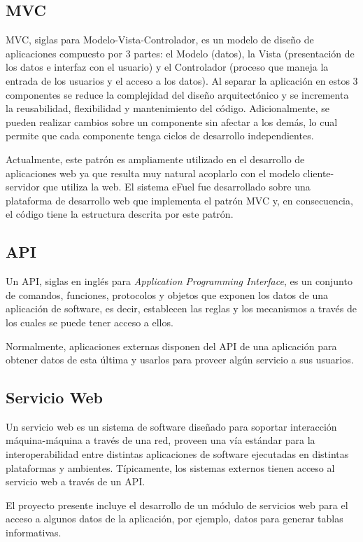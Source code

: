\subsection{MVC}
MVC, siglas para Modelo-Vista-Controlador, es un modelo de diseño de aplicaciones compuesto por 3 partes: el Modelo (datos), la Vista (presentación de los datos e interfaz con el usuario) y el Controlador (proceso que maneja la entrada de los usuarios y el acceso a los datos). \cite{mvcKrasner} Al separar la aplicación en estos 3 componentes se reduce la complejidad del diseño arquitectónico y se incrementa la reusabilidad, flexibilidad y mantenimiento del código. Adicionalmente, se pueden realizar cambios sobre un componente sin afectar a los demás, lo cual permite que cada componente tenga ciclos de desarrollo independientes.

Actualmente, este patrón es ampliamente utilizado en el desarrollo de aplicaciones web ya que resulta muy natural acoplarlo con el modelo cliente-servidor que utiliza la web. El sistema eFuel fue desarrollado sobre una plataforma de desarrollo web que implementa el patrón MVC y, en consecuencia, el código tiene la estructura descrita por este patrón.

\subsection{API}
Un API, siglas en inglés para \textit{Application Programming Interface}, es un conjunto de comandos, funciones, protocolos y objetos que exponen los datos de una aplicación de software, es decir, establecen las reglas y los mecanismos a través de los cuales se puede tener acceso a ellos. \cite{apiChristensson}

Normalmente, aplicaciones externas disponen del API de una aplicación para obtener datos de esta última y usarlos para proveer algún servicio a sus usuarios.

\subsection{Servicio Web}
Un servicio web es un sistema de software diseñado para soportar interacción máquina-máquina a través de una red, proveen una vía estándar para la interoperabilidad entre distintas aplicaciones de software ejecutadas en distintas plataformas y ambientes. \cite{webServiceW3C} Típicamente, los sistemas externos tienen acceso al servicio web a través de un API.

El proyecto presente incluye el desarrollo de un módulo de servicios web para el acceso a algunos datos de la aplicación, por ejemplo, datos para generar tablas informativas.

